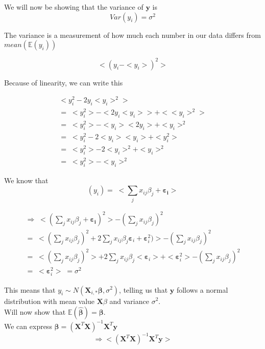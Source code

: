 \documentclass[reprint,english,notitlepage]{revtex4-1}  %
\begin{document}
    We will now be showing that the variance of $\mathbf{y}$ is 
    $$Var(y_i) = \sigma^2$$
    
    The variance is a measurement of how much each number in our data differs from $mean(\mathbb{E}(y_i))$  

    $$<(y_i - <y_i>)^2>$$

    Because of linearity, we can write this
    
    \begin{gather*}    
     <y_i^2 - 2y_i <y_i>^2 > \\ = \;  <y_i^2> - <2y_i <y_i>> + <<y_i>^2> \\
    = \; <y_i^2> - <y_i><2y_i> + <y_i>^2 \\ 
    = \; <y_i^2 - 2<y_i><y_i> + <y_i^2> \\  =  \; <y_i^2> - 2<y_i>^2 + <y_i>^2 \\
    = \; <y_i^2> - <y_i>^2
    \end{gather*}

    We know that $$(y_i) =  \; <\sum_j x_{ij} \beta_j + \boldsymbol{\varepsilon_i}>$$

    \begin{gather*}
        \Rightarrow  \; <(\sum_j x_{ij} \beta_j + \boldsymbol{\varepsilon_i})^2> - (\sum_j x_{ij} \beta_j)^2 \\
        =  \; <(\sum_j x_{ij} \beta_j)^2 + 2  \sum_j x_{ij} \beta_j \boldsymbol{\varepsilon}_i + \boldsymbol{\varepsilon}_i^2)> - (\sum_j x_{ij} \beta_j)^2 \\
        =  \; <(\sum_j x_{ij} \beta_j)^2> + 2  \sum_j x_{ij} \beta_j <\boldsymbol{\varepsilon}_i> + <\boldsymbol{\varepsilon}_i^2> - (\sum_j x_{ij} \beta_j)^2 \\
        =  \; <\boldsymbol{\varepsilon}_i^2>  \; =   \sigma^2
    \end{gather*}


    This means that $y_i \sim N(\mathbf{X}_{i,*}\boldsymbol{\beta}, \sigma^2)$, telling us that $\mathbf{y}$ follows a normal distribution with mean value $\mathbf{X} \beta$ and variance $\sigma^2$. \\

    Will now show that $\mathbb{E}(\boldsymbol{\hat{\beta}}) = \boldsymbol{\beta}$. \\

    We can express $\boldsymbol{\beta} = (\mathbf{X}^T\mathbf{X})^{-1}\mathbf{X}^T \mathbf{y}$ \\ $$\Rightarrow  <(\mathbf{X}^T\mathbf{X})^{-1}\mathbf{X}^T \mathbf{y}>$$ \\
\end{document}
